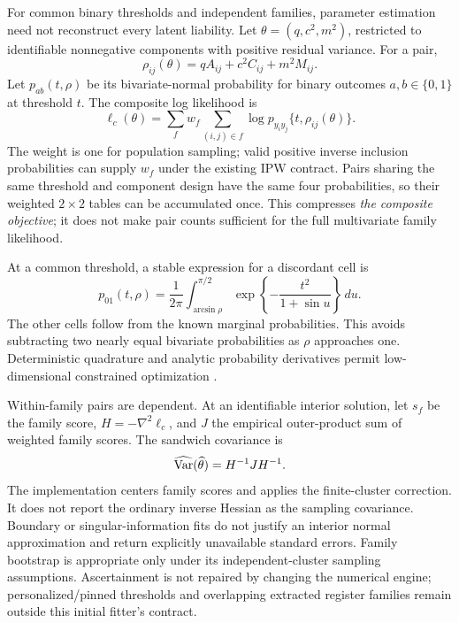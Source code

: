 For common binary thresholds and independent families, parameter estimation
need not reconstruct every latent liability. Let $\theta=(q,c^2,m^2)$,
restricted to identifiable nonnegative components with positive residual
variance. For a pair,
\begin{equation}
 \rho_{ij}(\theta)=qA_{ij}+c^2C_{ij}+m^2M_{ij}.
 \label{eq:pairwise-rho}
\end{equation}
Let $p_{ab}(t,\rho)$ be its bivariate-normal probability for binary outcomes
$a,b\in\{0,1\}$ at threshold $t$. The composite log likelihood is
\begin{equation}
 \ell_c(\theta)=\sum_f w_f\sum_{(i,j)\in f}
           \log p_{y_i y_j}\{t,\rho_{ij}(\theta)\}.
 \label{eq:composite-likelihood}
\end{equation}
The weight is one for population sampling; valid positive inverse inclusion
probabilities can supply $w_f$ under the existing IPW contract. Pairs sharing
the same threshold and component design have the same four probabilities,
so their weighted $2\times2$ tables can be accumulated once. This compresses
\emph{the composite objective}; it does not make pair counts sufficient for
the full multivariate family likelihood.

At a common threshold, a stable expression for a discordant cell is
\begin{equation}
 p_{01}(t,\rho)=\frac{1}{2\pi}\int_{\arcsin\rho}^{\pi/2}
       \exp\!\left\{-\frac{t^2}{1+\sin u}\right\}\,du.
 \label{eq:pair-discordance}
\end{equation}
The other cells follow from the known marginal probabilities. This avoids
subtracting two nearly equal bivariate probabilities as $\rho$ approaches
one. Deterministic quadrature and analytic probability derivatives permit
low-dimensional constrained optimization \cite{renard2004,bravo2019}.

Within-family pairs are dependent. At an identifiable interior solution,
let $s_f$ be the family score, $H=-\nabla^2\ell_c$, and $J$ the empirical
outer-product sum of weighted family scores. The sandwich covariance is
\begin{equation}
 \widehat{\mathrm{Var}}(\widehat\theta)=H^{-1}JH^{-1}.
 \label{eq:pairwise-sandwich}
\end{equation}
The implementation centers family scores and applies the finite-cluster
correction. It does not report the ordinary inverse Hessian as the sampling
covariance. Boundary or singular-information fits do not justify an interior
normal approximation and return explicitly unavailable standard errors.
Family bootstrap is appropriate only under its independent-cluster sampling
assumptions. Ascertainment is not repaired by changing the numerical engine;
personalized/pinned thresholds and overlapping extracted register families
remain outside this initial fitter's contract.

